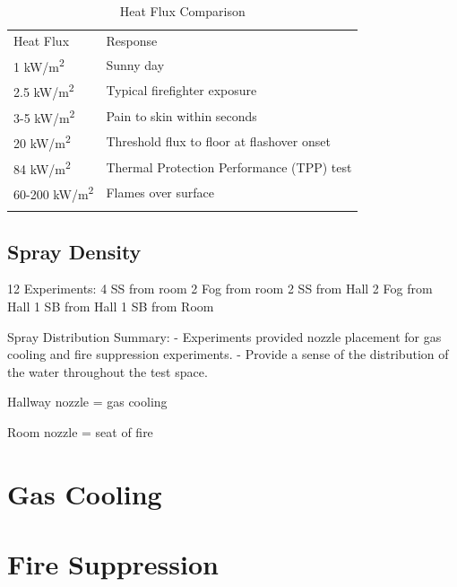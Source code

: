 \documentclass[12pt,oneside]{book}
\begin{document}
\begin{table}
	\centering
	\caption{Heat Flux Comparison}
	\begin{tabular}{ll}
		\hline\noalign{\smallskip}
		Heat Flux	  				   & Response		\\
		\noalign{\smallskip}\hline\noalign{\smallskip}
		1 kW/m\textsuperscript{2}      & Sunny day      \\
		2.5 kW/m\textsuperscript{2}    & Typical firefighter exposure     \\
		3-5 kW/m\textsuperscript{2}    & Pain to skin within seconds      \\
		20 kW/m\textsuperscript{2}     & Threshold flux to floor at flashover onset    \\
		84 kW/m\textsuperscript{2}     & Thermal Protection Performance (TPP) test    \\
		60-200 kW/m\textsuperscript{2} & Flames over surface     \\
		\noalign{\smallskip}\hline
	\end{tabular}
	\label{tab:Heat_Flux_Comparison}
\end{table}

\subsection{Spray Density}
\label{subsec:Spray_Density}



 
12 Experiments:
4 SS from room
2 Fog from room
2 SS from Hall
2 Fog from Hall
1 SB from Hall
1 SB from Room

Spray Distribution Summary:
- Experiments provided nozzle placement for gas cooling and fire suppression experiments.
- Provide a sense of the distribution of the water throughout the test space.

Hallway nozzle = gas cooling

Room nozzle = seat of fire

\section{Gas Cooling}
\label{sec:Gas_Cooling}

\section{Fire Suppression}
\label{sec:Fire_Suppression}	
\end{document}
